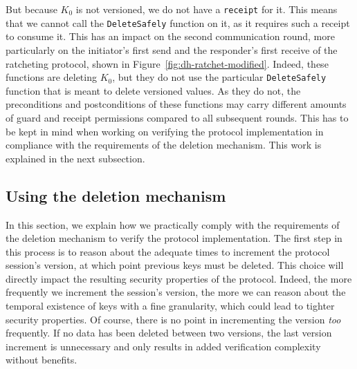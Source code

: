 But because $K_0$ is not versioned, we do not have a \texttt{receipt} for it.
This means that we cannot call the \texttt{DeleteSafely} function on it, as it requires such a receipt to consume it.
This has an impact on the second communication round, more particularly on the initiator's first send and the responder's first receive of the ratcheting protocol, shown in Figure~\ref{fig:dh-ratchet-modified}.
Indeed, these functions are deleting $K_0$, but they do not use the particular \texttt{DeleteSafely} function that is meant to delete versioned values.
As they do not, the preconditions and postconditions of these functions may carry different amounts of guard and receipt permissions compared to all subsequent rounds.
This has to be kept in mind when working on verifying the protocol implementation in compliance with the requirements of the deletion mechanism.
This work is explained in the next subsection.

\subsection{Using the deletion mechanism}

In this section, we explain how we practically comply with the requirements of the deletion mechanism to verify the protocol implementation.
The first step in this process is to reason about the adequate times to increment the protocol session's version, at which point previous keys must be deleted.
This choice will directly impact the resulting security properties of the protocol.
Indeed, the more frequently we increment the session's version, the more we can reason about the temporal existence of keys with a fine granularity, which could lead to tighter security properties.
Of course, there is no point in incrementing the version \emph{too} frequently.
If no data has been deleted between two versions, the last version increment is unnecessary and only results in added verification complexity without benefits.

